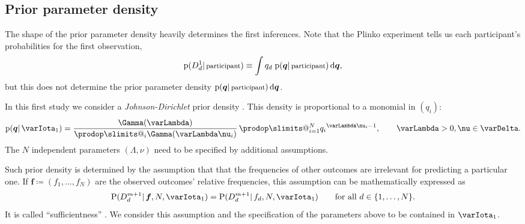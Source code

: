 \documentclass[\ifafour a4paper,12pt,\else a5paper,10pt,\fi%
onecolumn,oneside,article,%
british%
]{memoir}
\makeatletter
\theoremstyle{remark}
\theoremstyle{innote}
\def\sum{\DOTSI\sumop\slimits@}
\def\prod{\DOTSI\prodop\slimits@}
\let\parentext=\parentexttrack%
\newcommand*{\citep}{\parencites}
\newcommand*{\citey}{\parencites*}
\renewcommand*{\cites}{\parencites}
\newcommand*{\di}{\mathrm{d}}%
\newcommand*{\defd}{\coloneqq}
\DeclarePairedDelimiter\set{\{}{\}}
\newcommand*{\pf}{\mathrm{p}}%
\newcommand*{\p}{\mathrm{P}}%
\renewcommand*{\|}{\mathpunct{|}}
\newcommand*{\chap}{ch.}%
\newcommand*{\tsum}{\mathop{\textstyle\sum}\nolimits}
\newcommand*{\simpl}{\varDelta}
\newcommand*{\yqq}{q}
\newcommand*{\yq}{\bm{\yqq}}
\newcommand*{\yff}{f}
\newcommand*{\yf}{\bm{\yff}}
\newcommand*{\yI}{\varIota}
\newcommand*{\yMJ}{\yI_1}
\newcommand*{\yN}{\varLambda}
\newcommand*{\ynn}{\nu}
\makeatother
\begin{document}
\subsection{Prior parameter density}
\label{sec:initial_prior}

The shape of the prior parameter density heavily determines the first
inferences. Note that the Plinko experiment tells us each participant's
probabilities for the first observation,
\begin{equation}
  \label{eq:initial_predictive}
  \pf(D^1_{d} \| \text{\footnotesize participant}) \equiv \int \yqq_{d}\;
  \pf(\yq \| \text{\footnotesize participant})\,\di\yq,
\end{equation}
but this does not determine the prior parameter density
$\pf(\yq \| \text{\footnotesize participant})\,\di\yq$.

In this first study we consider a \emph{Johnson-Dirichlet} prior density
\parentext{references below}. This density is proportional to a monomial
in $(\yqq_i)$:
\begin{equation}
  \label{eq:JD_prior}
  \pf(\yq \| \yMJ) =
  \frac{\Gamma(\yN)}{\prod_i \Gamma(\yN\ynn_i)}\,
  \prod_{i=1}^N{\yqq_i}^{\yN\ynn_i-1}, \qquad \yN>0, \ynn \in \simpl.
\end{equation}
The $N$ independent parameters $(\yN, \ynn)$ need to be specified by
additional assumptions.

Such prior density is determined by the assumption that that the
frequencies of other outcomes are irrelevant for predicting a particular
one. If $\yf \defd (\yff_{1},\dotsc,\yff_{N})$ are the observed
outcomes' relative frequencies, this assumption can be mathematically
expressed as
\begin{equation}
  \label{eq:sufficientness}
  \p(D^{m+1}_d \| \yf, N, \yMJ) =
  \p(D^{m+1}_{d} \| \yff_{d}, N, \yMJ)
  \qquad\text{for all } d\in\set{1,\dotsc, N}.
\end{equation}
It is called \enquote{sufficientness}
\cites{johnson1924,johnson1932c}[\chap~4]{good1965}{zabell1982,jaynes1986d_r1996}.
We consider this assumption and the specification of the parameters above
to be contained in $\yMJ$.
\end{document}
